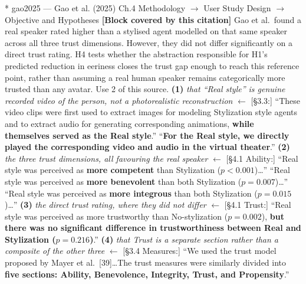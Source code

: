 \documentclass[11pt, a4paper]{article}
\makeatletter
\newcounter{citentry}
\newcommand{\citentry@core}[7]{%
  \stepcounter{citentry}
  \begingroup
  \sbox{\citentry@measurebox}{%
    \begin{minipage}{\linewidth}
      \noindent\colorbox{konstanzblue}{\parbox{\dimexpr\linewidth-2\fboxsep}{%
        \vspace{3pt}
        \textbf{\#\thecitentry \quad #2} \hfill \textit{#3}
        \vspace{3pt}
      }}
      \vspace{3pt}
      \noindent\begin{tabular}{@{}p{2.7cm} p{\dimexpr\linewidth-3cm}@{}}
        \textit{\small Sentence in thesis:} & #4 \\[5pt]
        \textbf{Usage:}\hfill       & #5 \\[5pt]
        \textit{\small Original source:}     & #6 \\[5pt]
        \textbf{How to check:}             & #7 \\
      \end{tabular}
      \vspace{5pt}
      \rule{10pt}{10pt}\quad \textbf{Validated} --- I have read the original and agree it supports the sentence.
    \end{minipage}%
  }%
  \Needspace{\dimexpr\ht\citentry@measurebox+\dp\citentry@measurebox\relax}%
  \endgroup
  \vspace{10pt}
  \noindent\colorbox{konstanzblue}{\parbox{\dimexpr\linewidth-2\fboxsep}{%
    \vspace{3pt}
    \textcolor{white}{\textbf{\#\thecitentry \quad #2}} \hfill \textcolor{white}{\textit{#3}}
    \vspace{3pt}
  }}
  \vspace{3pt}
  \noindent\begin{tabular}{@{}p{2.7cm} p{\dimexpr\linewidth-3cm}@{}}
    \textit{\small Sentence in thesis:} & \textcolor{darkgreen}{#4} \\[5pt]
    \textbf{Usage:}\hfill       & #5 \\[5pt]
    \textit{\small Original source:}     & \textcolor{darkred}{#6} \\[5pt]
    \textbf{How to check:}             & #7 \\
  \end{tabular}
  \vspace{5pt}
  \noindent\CheckBox[name=verified\thecitentry, width=10pt, height=10pt, bordercolor={0 0 0}, borderwidth=0.75, backgroundcolor={1 1 1}#1]{}\quad \textbf{Validated} --- I have read the original and agree it supports the sentence.
  \vspace{3pt}
  \noindent\textcolor{midgray}{\rule{\linewidth}{0.4pt}}
}
\newcommand{\citentry}{\@ifstar{\citentry@core{, checked}}{\citentry@core{}}}
\makeatother
\begin{document}
\begin{Form}
\citentry*
  {gao2025 --- Gao et al. (2025)}
  {Ch.4 Methodology $\rightarrow$ User Study Design $\rightarrow$ Objective and Hypotheses}
  {\textbf{[Block covered by this citation]} Gao et al.\ found a real speaker rated higher than a stylised agent modelled on that same speaker across all three trust dimensions. However, they did not differ significantly on a direct trust rating. H4 tests whether the abstraction responsible for H1's predicted reduction in eeriness closes the trust gap enough to reach this reference point, rather than assuming a real human speaker remains categorically more trusted than any avatar.}
  {Use 2 of this source.}
  {\textbf{(1)} \emph{that ``Real style'' is genuine recorded video of the person, not a photorealistic reconstruction} $\leftarrow$ [\S3.3:] ``These video clips were first used to extract images for modeling Stylization style agents and to extract audio for generating corresponding animations, \textbf{while themselves served as the Real style}.'' \quad [\S3.3:] ``\textbf{For the Real style, we directly played the corresponding video and audio in the virtual theater}.'' \quad \textbf{(2)} \emph{the three trust dimensions, all favouring the real speaker} $\leftarrow$ [\S4.1 Ability:] ``Real style was perceived as \textbf{more competent} than Stylization ($p < 0.001$)\ldots'' \quad [\S4.1 Benevolence:] ``Real style was perceived as \textbf{more benevolent} than both Stylization ($p = 0.007$)\ldots'' \quad [\S4.1 Integrity:] ``Real style was perceived as \textbf{more integrous} than both Stylization ($p = 0.015$)\ldots'' \quad \textbf{(3)} \emph{the direct trust rating, where they did not differ} $\leftarrow$ [\S4.1 Trust:] ``Real style was perceived as more trustworthy than No-stylization ($p = 0.002$), \textbf{but there was no significant difference in trustworthiness between Real and Stylization ($p = 0.216$)}.'' \quad \textbf{(4)} \emph{that Trust is a separate section rather than a composite of the other three} $\leftarrow$ [\S3.4 Measures:] ``We used the trust model proposed by Mayer et al.\ [39]\ldots The trust measures were similarly divided into \textbf{five sections: Ability, Benevolence, Integrity, Trust, and Propensity}.''}

\end{Form}
\end{document}
